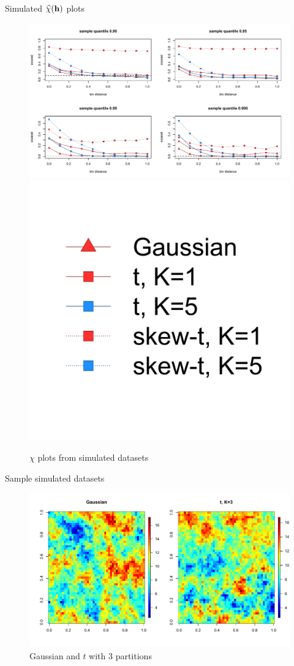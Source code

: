 \documentclass{beamer}
\begin{document}
\begin{frame}{Simulated $\widehat{\chi}(\mbox{\bf h})$ plots}
  \centering
  \begin{figure}
  \includegraphics[width=1\linewidth]{./plots/chi-plots.pdf}\\[-0.25in]
  \includegraphics[width=0.2\linewidth]{./plots/chi-legend.pdf}
  \caption{$\chi$ plots from simulated datasets}
  \end{figure}
\end{frame}

\begin{frame}{Sample simulated datasets}
  \centering
  \begin{figure}
  \includegraphics[width=1\linewidth]{./plots/gauss-vs-t3.pdf}
  \caption{Gaussian and $t$ with 3 partitions}
  \end{figure}
\end{frame}
\end{document}
